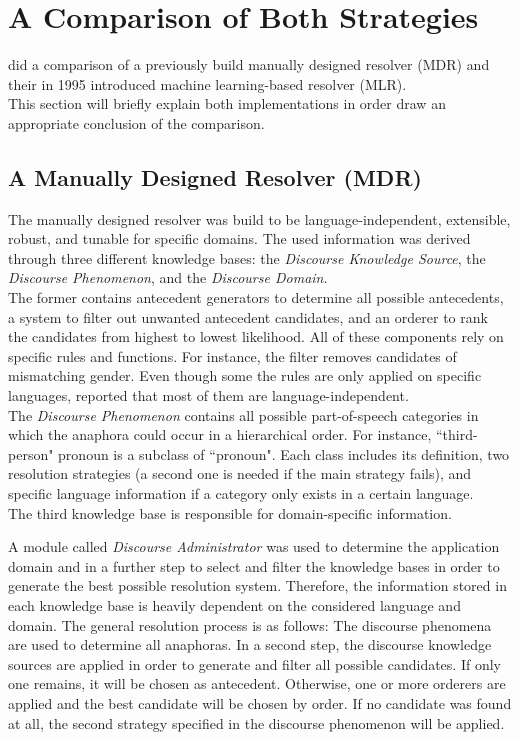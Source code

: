 \section{A Comparison of Both Strategies}
\cite{aone1995evaluating} did a comparison of a previously build manually designed resolver (MDR) \citep{aone1993language} and their in 1995 introduced machine learning-based resolver (MLR).\\
This section will briefly explain both implementations in order draw an appropriate conclusion of the comparison. %

\subsection{A Manually Designed Resolver (MDR)}
The manually designed resolver was build to be language-independent, extensible, robust, and tunable for specific domains. The used information was derived through three different knowledge bases: the \textit{Discourse Knowledge Source}, the \textit{Discourse Phenomenon}, and the \textit{Discourse Domain}. \\
The former contains antecedent generators to determine all possible antecedents, a system to filter out unwanted antecedent candidates, and an orderer to rank the candidates from highest to lowest likelihood. All of these components rely on specific rules and functions. For instance, the filter removes candidates of mismatching gender. Even though some the rules are only applied on specific languages, \citep{aone1993language} reported that most of them are language-independent.\\
The \textit{Discourse Phenomenon} contains all possible part-of-speech categories in which the anaphora could occur in a hierarchical order. For instance, “third-person" pronoun is a subclass of “pronoun". Each class includes its definition, two resolution strategies (a second one is needed if the main strategy fails), and specific language information if a category only exists in a certain language.\\
The third knowledge base is responsible for domain-specific information. 

A module called \textit{Discourse Administrator} was used to determine the application domain and in a further step to select and filter the knowledge bases in order to generate the best possible resolution system. Therefore, the information stored in each knowledge base is heavily dependent on the considered language and domain. The general resolution process is as follows: The discourse phenomena are used to determine all anaphoras. In a second step, the discourse knowledge sources are applied in order to generate and filter all possible candidates. If only one remains, it will be chosen as antecedent. Otherwise, one or more orderers are applied and the best candidate will be chosen by order. If no candidate was found at all, the second strategy specified in the discourse phenomenon will be applied.


